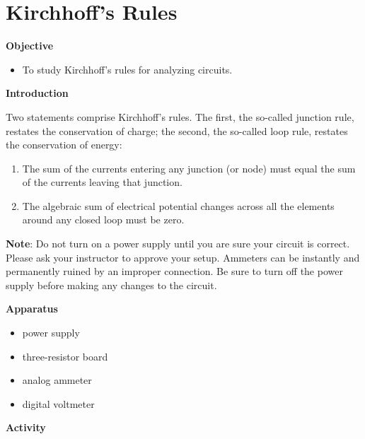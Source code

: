 
\section{Kirchhoff's Rules}

\makelabheader %

\textbf{Objective}

\begin{itemize}
\item To study Kirchhoff's rules for analyzing circuits.
\end{itemize}
\textbf{Introduction}

Two statements comprise Kirchhoff's rules. The first, the so-called
junction rule, restates the conservation of charge; the second, the
so-called loop rule, restates the conservation of energy:

\begin{enumerate}
\item The sum of the currents entering any junction (or node) must equal
the sum of the currents leaving that junction.
\item The algebraic sum of electrical potential changes across all the elements
around any closed loop must be zero.
\end{enumerate}
\textbf{Note}: Do not turn on a power supply until you are sure your
circuit is correct. Please ask your instructor to approve your setup.
Ammeters can be instantly and permanently ruined by an improper connection.
Be sure to turn off the power supply before making any changes to
the circuit.

\textbf{Apparatus}

\begin{itemize}
\item power supply
\item three-resistor board
\item analog ammeter
\item digital voltmeter
\end{itemize}
\textbf{Activity}

\vspace{0.3cm}
{\centering {} \par}
\vspace{0.3cm}

